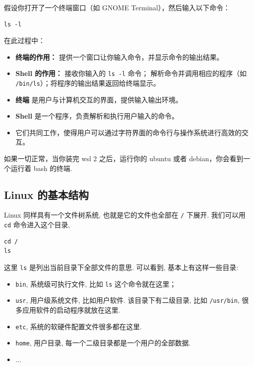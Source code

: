 \documentclass[a4paper]{ctexart}
\begin{document}
假设你打开了一个终端窗口（如 GNOME Terminal），然后输入以下命令：

\begin{verbatim}
ls -l
\end{verbatim}

在此过程中：
\begin{itemize}
    \item \textbf{终端的作用：} 提供一个窗口让你输入命令，并显示命令的输出结果。
    \item \textbf{Shell 的作用：} 接收你输入的 \texttt{ls -l} 命令；
    解析命令并调用相应的程序（如 \texttt{/bin/ls}）；将程序的输出结果返回给终端显示。
\end{itemize}

\begin{itemize}
    \item \textbf{终端} 是用户与计算机交互的界面，提供输入输出环境。
    \item \textbf{Shell} 是一个程序，负责解析和执行用户输入的命令。
    \item 它们共同工作，使得用户可以通过字符界面的命令行与操作系统进行高效的交互。
\end{itemize}

如果一切正常，当你装完 wsl 2 之后，运行你的 ubuntu 或者 debian，你会看到一个运行着 bash 的终端.

\subsection{Linux 的基本结构}

Linux 同样具有一个文件树系统, 也就是它的文件也全部在 \verb|/| 下展开. 我们可以用 \verb|cd| 命令进入这个目录,
\begin{verbatim}
cd /
ls
\end{verbatim}

这里 \verb|ls| 是列出当前目录下全部文件的意思. 可以看到, 基本上有这样一些目录:

\begin{itemize}
\item \verb|bin|, 系统级可执行文件, 比如 \verb|ls| 这个命令就在这里；
\item \verb|usr|, 用户级系统文件, 比如用户软件. 该目录下有二级目录, 比如 \verb|/usr/bin|,
  很多应用软件的启动程序就放在这里.
\item \verb|etc|, 系统的软硬件配置文件很多都在这里.
\item \verb|home|, 用户目录, 每一个二级目录都是一个用户的全部数据. 
\item ...
\end{itemize}
\end{document}
